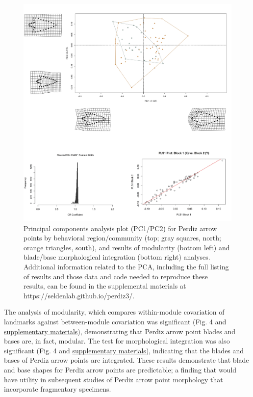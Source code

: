 \documentclass[smallextended]{svjour3}       %
\begin{document}
\begin{figure}
\includegraphics[width=1\linewidth]{ms-figs/figure4} \caption{Principal components analysis plot (PC1/PC2) for Perdiz arrow points by behavioral region/community (top; gray squares, north; orange triangles, south), and results of modularity (bottom left) and blade/base morphological integration (bottom right) analyses. Additional information related to the PCA, including the full listing of results and those data and code needed to reproduce these results, can be found in the supplemental materials at https://seldenlab.github.io/perdiz3/.}\label{fig:fig4}
\end{figure}

The analysis of modularity, which compares within-module covariation of
landmarks against between-module covariation was significant (Fig. 4 and
\href{https://seldenlab.github.io/perdiz3/}{supplementary materials}),
demonstrating that Perdiz arrow point blades and bases are, in fact,
modular. The test for morphological integration was also significant
(Fig. 4 and \href{https://seldenlab.github.io/perdiz3/}{supplementary
materials}), indicating that the blades and bases of Perdiz arrow points
are integrated. These results demonstrate that blade and base shapes for
Perdiz arrow points are predictable; a finding that would have utility
in subsequent studies of Perdiz arrow point morphology that incorporate
fragmentary specimens.
\end{document}
